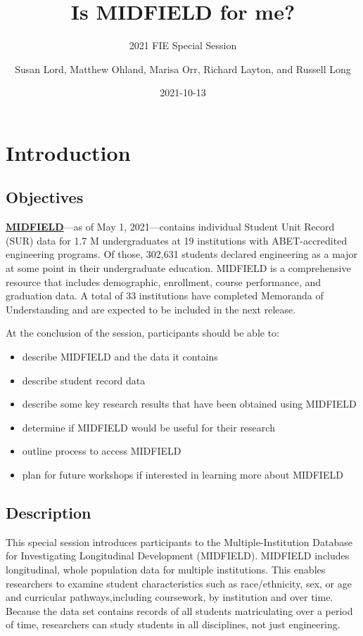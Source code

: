 \documentclass[
]{book}
\title{Is MIDFIELD for me?}
\subtitle{2021 FIE Special Session}
\author{Susan Lord, Matthew Ohland, Marisa Orr, Richard Layton, and Russell Long}
\date{2021-10-13}
\providecommand{\tightlist}{%
  \setlength{\itemsep}{0pt}\setlength{\parskip}{0pt}}
\begin{document}
\maketitle

{
\setcounter{tocdepth}{1}
\tableofcontents
}
\hypertarget{introduction}{%
\chapter{Introduction}\label{introduction}}

\hypertarget{objectives}{%
\section{Objectives}\label{objectives}}

\href{https://engineering.purdue.edu/MIDFIELD}{\textbf{MIDFIELD}}---as of May 1, 2021---contains individual Student Unit Record (SUR) data for 1.7 M undergraduates at 19 institutions with ABET-accredited engineering programs. Of those, 302,631 students declared engineering as a major at some point in their undergraduate education. MIDFIELD is a comprehensive resource that includes demographic, enrollment, course performance, and graduation data. A total of 33 institutions have completed Memoranda of Understanding and are expected to be included in the next release.

At the conclusion of the session, participants should be able
to:

\begin{itemize}
\tightlist
\item
  describe MIDFIELD and the data it contains
\item
  describe student record data
\item
  describe some key research results that have been obtained using MIDFIELD
\item
  determine if MIDFIELD would be useful for their research
\item
  outline process to access MIDFIELD
\item
  plan for future workshops if interested in learning more about MIDFIELD
\end{itemize}

\hypertarget{description}{%
\section{Description}\label{description}}

This special session introduces participants to the Multiple-Institution Database for Investigating Longitudinal Development (MIDFIELD). MIDFIELD includes longitudinal, whole population data for multiple institutions. This enables researchers to examine student characteristics such as race/ethnicity, sex, or age and curricular pathways,including coursework, by institution and over time. Because the data set contains records of all students matriculating over a period of time, researchers can study students in all disciplines, not just engineering.
\end{document}

